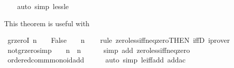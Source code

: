 \begin{isabellebody}
%
\isadelimproof
\ \ %
\endisadelimproof
%
\isatagproof
{}\isamarkupfalse%
\ {\isacharparenleft}{\kern0pt}auto\ simp{\isacharcolon}{\kern0pt}\ less{\isacharunderscore}{\kern0pt}le{\isacharparenright}{\kern0pt}%
\endisatagproof
{\isafoldproof}%
%
\isadelimproof
%
\endisadelimproof
%
\begin{isamarkuptext}%
This theorem is useful with %
\end{isamarkuptext}\isamarkuptrue%
\isamarkupfalse%
\ gr{\isacharunderscore}{\kern0pt}zeroI{\isacharcolon}{\kern0pt}\ {\isachardoublequoteopen}{\isacharparenleft}{\kern0pt}n\ {\isacharequal}{\kern0pt}\ {}\ {\isasymLongrightarrow}\ False{\isacharparenright}{\kern0pt}\ {\isasymLongrightarrow}\ {}\ {\isacharless}{\kern0pt}\ n{\isachardoublequoteclose}\isanewline
%
\isadelimproof
\ \ %
\endisadelimproof
%
\isatagproof
{}\isamarkupfalse%
\ {\isacharparenleft}{\kern0pt}rule\ zero{\isacharunderscore}{\kern0pt}less{\isacharunderscore}{\kern0pt}iff{\isacharunderscore}{\kern0pt}neq{\isacharunderscore}{\kern0pt}zero{\isacharbrackleft}{\kern0pt}THEN\ iffD{}{\isacharbrackright}{\kern0pt}{\isacharparenright}{\kern0pt}\ iprover%
\endisatagproof
{\isafoldproof}%
%
\isadelimproof
\isanewline
%
\endisadelimproof
\isanewline
{}\isamarkupfalse%
\ not{\isacharunderscore}{\kern0pt}gr{\isacharunderscore}{\kern0pt}zero{\isacharbrackleft}{\kern0pt}simp{\isacharbrackright}{\kern0pt}{\isacharcolon}{\kern0pt}\ {\isachardoublequoteopen}{\isasymnot}\ {}\ {\isacharless}{\kern0pt}\ n\ {\isasymlongleftrightarrow}\ n\ {\isacharequal}{\kern0pt}\ {}{\isachardoublequoteclose}\isanewline
%
\isadelimproof
\ \ %
\endisadelimproof
%
\isatagproof
{}\isamarkupfalse%
\ {\isacharparenleft}{\kern0pt}simp\ add{\isacharcolon}{\kern0pt}\ zero{\isacharunderscore}{\kern0pt}less{\isacharunderscore}{\kern0pt}iff{\isacharunderscore}{\kern0pt}neq{\isacharunderscore}{\kern0pt}zero{\isacharparenright}{\kern0pt}%
\endisatagproof
{\isafoldproof}%
%
\isadelimproof
\isanewline
%
\endisadelimproof
\isanewline
{}\isamarkupfalse%
\ ordered{\isacharunderscore}{\kern0pt}comm{\isacharunderscore}{\kern0pt}monoid{\isacharunderscore}{\kern0pt}add\isanewline
%
\isadelimproof
\ \ %
\endisadelimproof
%
\isatagproof
{}\isamarkupfalse%
\ \isamarkupfalse%
\ {\isacharparenleft}{\kern0pt}auto\ simp{\isacharcolon}{\kern0pt}\ le{\isacharunderscore}{\kern0pt}iff{\isacharunderscore}{\kern0pt}add\ add{\isacharunderscore}{\kern0pt}ac{\isacharparenright}{\kern0pt}%

\end{isabellebody}
